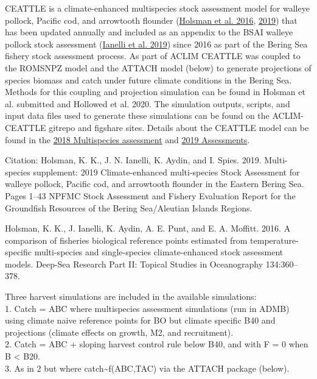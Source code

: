 \documentclass[]{article}
\begin{document}
CEATTLE is a climate-enhanced multispecies stock assessment model for
walleye pollock, Pacific cod, and arrowtooth flounder
(\href{\%22https://www.sciencedirect.com/science/article/pii/S0967064515002751\%22}{Holsman
et al. 2016},
\href{\%22https://archive.afsc.noaa.gov/refm/docs/2019/EBSmultispp.pdf\%22}{2019})
that has been updated annually and included as an appendix to the BSAI
walleye pollock stock assessment
(\href{\%22https://archive.afsc.noaa.gov/refm/docs/2019/GOApollock.pdf\%22}{Ianelli
et al. 2019}) since 2016 as part of the Bering Sea fishery stock
assessment process. As part of ACLIM CEATTLE was coupled to the ROMSNPZ
model and the ATTACH model (below) to generate projections of species
biomass and catch under future climate conditions in the Bering Sea.
Methods for this coupling and projection simulation can be found in
Holsman et al. submitted and Hollowed et al. 2020. The simulation
outputs, scripts, and input data files used to generate these
simulations can be found on the ACLIM-CEATTLE gitrepo and figshare
sites. Details about the CEATTLE model can be found in the
\href{\%22https://archive.fisheries.noaa.gov/afsc/REFM/Docs/2018/BSAI/2018EBSmultispp-508.pdf\%22}{2018
Multispecies assessment} and
\href{\%22https://archive.afsc.noaa.gov/refm/docs/2019/EBSmultispp.pdf\%22}{2019
Assessments}.

Citation: Holsman, K. K., J. N. Ianelli, K. Aydin, and I. Spies. 2019.
Multi-species supplement: 2019 Climate-enhanced multi-species Stock
Assessment for walleye pollock, Pacific cod, and arrowtooth flounder in
the Eastern Bering Sea. Pages 1--43 NPFMC Stock Assessment and Fishery
Evaluation Report for the Groundfish Resources of the Bering
Sea/Aleutian Islands Regions.

Holsman, K. K., J. Ianelli, K. Aydin, A. E. Punt, and E. A. Moffitt.
2016. A comparison of fisheries biological reference points estimated
from temperature-specific multi-species and single-species
climate-enhanced stock assessment models. Deep-Sea Research Part II:
Topical Studies in Oceanography 134:360--378.

Three harvest simulations are included in the available simulations:\\
1. Catch = ABC where multispecies assessment simulations (run in ADMB)
using climate naive reference points for BO but climate specific B40 and
projections (climate effects on growth, M2, and recruitment).\\
2. Catch = ABC + sloping harvest control rule below B40, and with F = 0
when B \textless{} B20.\\
3. As in 2 but where catch\textasciitilde{}f(ABC,TAC) via the ATTACH
package (below).
\end{document}
